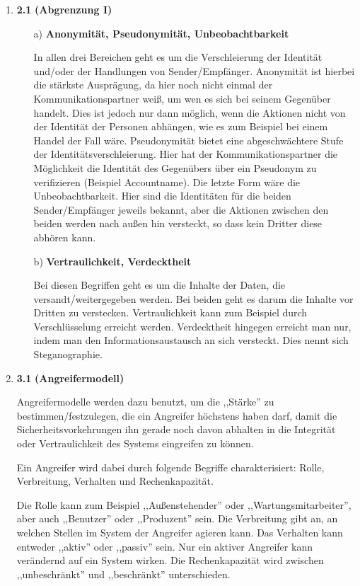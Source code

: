 \documentclass[a4paper,11pt]{article}
\author{\authorinfo}
\title{\titleinfo}
\date{\today}
\begin{document}
\maketitle


\begin {enumerate}
\item[\textbf{2.1}]
    \textbf{(Abgrenzung I)}

    \begin{enumerate}
    \item[a)]
        \textbf{Anonymität, Pseudonymität, Unbeobachtbarkeit}

        In allen drei Bereichen geht es um die Verschleierung der Identität und/oder der Handlungen von Sender/Empfänger. Anonymität ist hierbei die stärkste Ausprägung, da hier noch nicht einmal der Kommunikationspartner weiß, um wen es sich bei seinem Gegenüber handelt. Dies ist jedoch nur dann möglich, wenn die Aktionen nicht von der Identität der Personen abhängen, wie es zum Beispiel bei einem Handel der Fall wäre. Pseudonymität bietet eine abgeschwächtere Stufe der Identitätsverschleierung. Hier hat der Kommunikationspartner die Möglichkeit die Identität des Gegenübers über ein Pseudonym zu verifizieren (Beispiel Accountname). Die letzte Form wäre die Unbeobachtbarkeit. Hier sind die Identitäten für die beiden Sender/Empfänger jeweils bekannt, aber die Aktionen zwischen den beiden werden nach außen hin versteckt, so dass kein Dritter diese abhören kann.

    \item[b)]
        \textbf{Vertraulichkeit, Verdecktheit}

        Bei diesen Begriffen geht es um die Inhalte der Daten, die versandt/weitergegeben werden. Bei beiden geht es darum die Inhalte vor Dritten zu verstecken. Vertraulichkeit kann zum Beispiel durch Verschlüsselung erreicht werden. Verdecktheit hingegen erreicht man nur, indem man den Informationsaustausch an sich versteckt. Dies nennt sich Steganographie.
    \end{enumerate}

\item[\textbf{3.1}]
    \textbf{(Angreifermodell)}

    Angreifermodelle werden dazu benutzt, um die ,,Stärke'' zu bestimmen/festzulegen, die ein Angreifer höchstens haben darf, damit die Sicherheitsvorkehrungen ihn gerade noch davon abhalten in die Integrität oder Vertraulichkeit des Systems eingreifen zu können.

    Ein Angreifer wird dabei durch folgende Begriffe charakterisiert: Rolle, Verbreitung, Verhalten und Rechenkapazität.

    Die Rolle kann zum Beispiel ,,Außenstehender'' oder ,,Wartungsmitarbeiter'', aber auch ,,Benutzer'' oder ,,Produzent'' sein. Die Verbreitung gibt an, an welchen Stellen im System der Angreifer agieren kann. Das Verhalten kann entweder ,,aktiv'' oder ,,passiv'' sein. Nur ein aktiver Angreifer kann verändernd auf ein System wirken. Die Rechenkapazität wird zwischen ,,unbeschränkt'' und ,,beschränkt'' unterschieden.

\end{enumerate}
\end{document}

